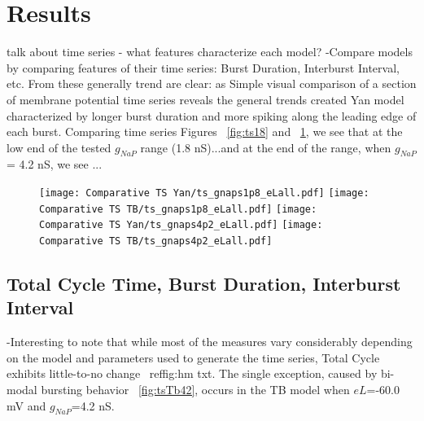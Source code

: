 \documentclass[11pt]{article}
\begin{document}
\oddsidemargin -0.22in
\evensidemargin -0.22in
\topmargin 0.05in
\topskip 0.25in
\headheight 0.05in
\headsep 0.25in

\graphicspath{{"../Data and Analysis/long TB Yan/plots/"}{"../Data and Analysis/short TB Yan/plots/"}}


\FloatBarrier
\section{Results}
talk about time series - what features characterize each model?
-Compare models by comparing features of their time series: Burst Duration, Interburst Interval, etc. 
From these generally trend are clear: as
Simple visual comparison of a section of membrane potential time series reveals the general trends created
Yan model characterized by longer burst duration and more spiking along the leading edge of each burst.
Comparing time series Figures ~\ref{fig:ts18} and ~\ref{fig:ts42}, we see that at the low end of the tested $g_{NaP}$ range (1.8 nS)...and at the end of the range, when $g_{NaP}$ = 4.2 nS, we see ...


\begin{figure}[h]
	\centering
	\texttt{[image: Comparative TS Yan/ts\_gnaps1p8\_eLall.pdf]}
	\texttt{[image: Comparative TS TB/ts\_gnaps1p8\_eLall.pdf]}
	\texttt{[image: Comparative TS Yan/ts\_gnaps4p2\_eLall.pdf]}
	\texttt{[image: Comparative TS TB/ts\_gnaps4p2\_eLall.pdf]}
	\label{fig:ts42}
\end{figure}

\subsection{Total Cycle Time, Burst Duration, Interburst Interval}


-Interesting to note that while most of the measures vary considerably depending on the model and parameters used to generate the time series, Total Cycle exhibits little-to-no change ~ref{fig:hm txt}. The single exception, caused by bi-modal bursting behavior ~\ref{fig:tsTb42}, occurs in the TB model when $eL$=-60.0 mV and $g_{NaP}$=4.2 nS. 
\end{document}
